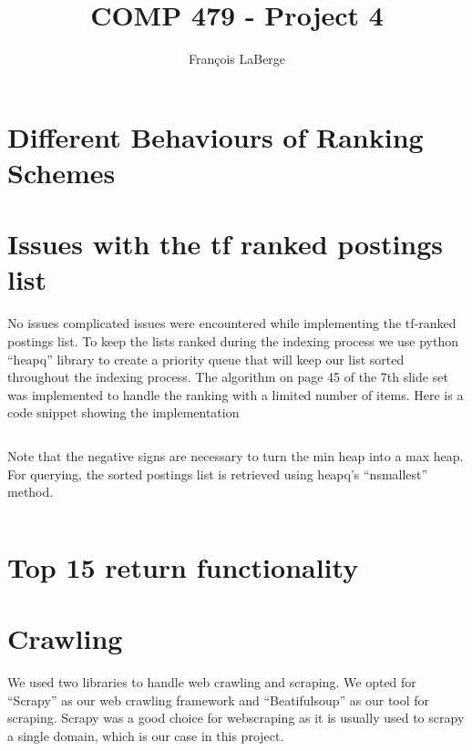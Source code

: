 \documentclass[]{article}
\title{COMP 479 - Project 4}
\author{François LaBerge}
\begin{document}
\maketitle

\section{Different Behaviours of Ranking Schemes}
\section{Issues with the tf ranked postings list}
No issues complicated issues were encountered while implementing the tf-ranked postings list. To keep the lists ranked during the indexing process we use python ``heapq'' library to create a priority queue that will keep our list sorted throughout the indexing process. The algorithm on page 45 of the 7th slide set was implemented to handle the ranking with a limited number of items. Here is a code snippet showing the implementation

\inputminted[]{python}{snip/tfranked.py}

Note that the negative signs are necessary to turn the min heap into a max heap. For querying, the sorted postings list is retrieved using heapq's ``nsmallest'' method. 

\inputminted[]{python}{snip/tfretrieve.py}

\section{Top 15 return functionality}
\section{Crawling}
We used two libraries to handle web crawling and scraping. We opted for ``Scrapy'' as our web crawling framework and ``Beatifulsoup'' as our tool for scraping. Scrapy was a good choice for webscraping as it is usually used to scrapy a single domain, which is our case in this project. 
\end{document}
